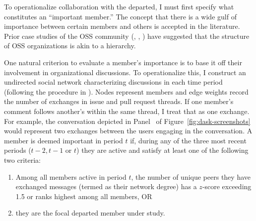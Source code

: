 \documentclass[12pt,notitlepage]{article}
\begin{document}
To operationalize collaboration with the departed, I must first specify what constitutes an “important member.” The concept that there is a wide gulf of importance between certain members and others is accepted in the literature. Prior case studies of the OSS community (\cite{cox_cathedrals_1998}, \cite{mockus_two_2002}, \cite{gacek_many_2004}) have suggested that the structure of OSS organizations is akin to a hierarchy.

One natural criterion to evaluate a member's importance is to base it off their involvement in organizational discussions. To operationalize this, I construct an undirected social network characterizing discussions in each time period (following the procedure in \cite{crowston_hierarchy_2006}). Nodes represent members and edge weights record the number of exchanges in issue and pull request threads. If one member’s comment follows another’s within the same thread, I treat that as one exchange. For example, the conversation depicted in Panel~ of Figure~\ref{fig:dask-screenshots} would represent two exchanges between the users engaging in the conversation. A member is deemed important in period $t$ if, during any of the three most recent periods ($t-2, t-1$ or $t$) they are active and satisfy at least one of the following two criteria:
\begin{enumerate}
    \item Among all members active in period $t$, the number of unique peers they have exchanged messages (termed as their network degree) has a $z$‐score exceeding 1.5 or ranks highest among all members, OR
    \item they are the focal departed member under study. 
\end{enumerate} 
\end{document}
